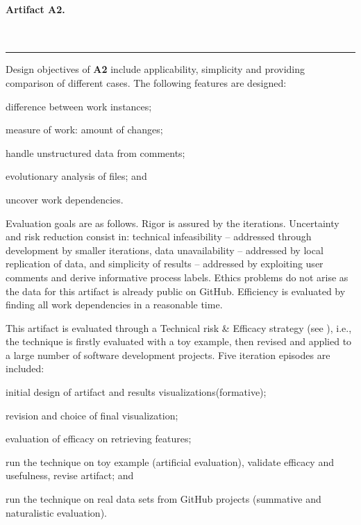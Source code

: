 \documentclass[a4paper,11pt]{article}
\begin{document}
\paragraph{Artifact A2.} 
~\\\noindent\rule[1ex]{2.5cm}{2pt}	

Design objectives of \textbf{A2} include applicability, simplicity and providing comparison of different cases. The following features are designed: 
	\begin{iiilist}
		\item difference between work instances;
		\item measure of work: amount of changes;
		\item handle unstructured data from comments;
		\item evolutionary analysis of files; and
		\item uncover work dependencies.
	\end{iiilist}
Evaluation goals are as follows. Rigor is assured by the iterations. Uncertainty and risk reduction consist in: technical infeasibility -- addressed through development by smaller iterations, data unavailability -- addressed by local replication of data, and simplicity of results -- addressed by exploiting user comments and derive informative process labels. Ethics problems do not arise as the data for this artifact is already public on GitHub. Efficiency is evaluated by finding all work dependencies in a reasonable time. 

This artifact is evaluated through a Technical risk \& Efficacy strategy (see \cite{Venable2016}), i.e., the technique is firstly evaluated with a toy example, then revised and applied to a large number of software development projects. Five iteration episodes are included: 
	\begin{iiilist}
		\item initial design of artifact and results  visualizations(formative);
		\item revision and choice of final visualization;
		\item evaluation of efficacy on retrieving features;
		\item run the technique on toy example (artificial evaluation), validate efficacy and usefulness, revise artifact; and
		\item run the technique on real data sets from GitHub projects (summative and naturalistic evaluation).
	\end{iiilist}
\end{document}
